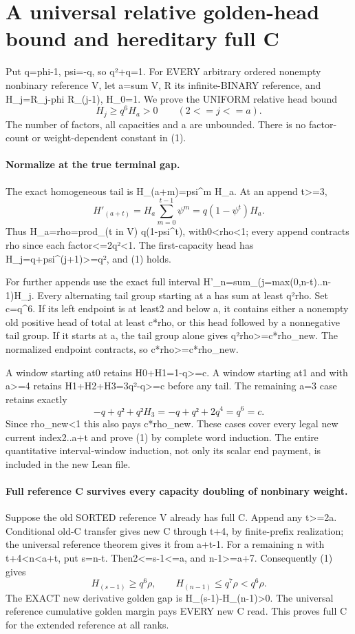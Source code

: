 \section{A universal relative golden-head bound and hereditary full C}
Put q=phi-1, psi=-q, so q²+q=1. For EVERY arbitrary ordered
nonempty nonbinary reference V, let a=sum V, R its infinite-BINARY
reference, and H_j=R_j-phi R_(j-1), H_0=1. We prove the UNIFORM
relative head bound
\[
                   H_j\ge q^6 H_a>0\qquad(2<=j<=a).     \tag{1}
\]
The number of factors, all capacities and a are unbounded.
There is no factor-count or weight-dependent constant in (1).

\paragraph{Normalize at the true terminal gap.}
The exact homogeneous tail is H_(a+m)=psi^m H_a. At an append t>=3,
\[
 H'_(a+t)=H_a\sum_{m=0}^{t-1}\psi^m
        =q(1-\psi^t)H_a.
\]
Thus H_a=rho=prod_(t in V) q(1-psi^t), with0<rho<1;
every append contracts rho since each factor<=2q²<1.
The first-capacity head has H_j=q+psi^(j+1)>=q², and (1) holds.

For further appends use the exact full interval
H'_n=sum_(j=max(0,n-t)..n-1)H_j. Every alternating tail group
starting at a has sum at least q²rho. Set c=q^6.
If its left endpoint is at least2 and below a, it contains either
a nonempty old positive head of total at least c*rho, or this
head followed by a nonnegative tail group. If it starts at a,
the tail group alone gives q²rho>=c*rho_new.
The normalized endpoint contracts, so c*rho>=c*rho_new.

A window starting at0 retains H0+H1=1-q>=c. A window starting
at1 and with a>=4 retains H1+H2+H3=3q²-q>=c before any tail.
The remaining a=3 case retains exactly
\[
                  -q+q²+q²H_3=-q+q²+2q^4=q^6=c.
\]
Since rho_new<1 this also pays c*rho_new. These cases cover
every legal new current index2..a+t and prove (1) by complete
word induction. The entire quantitative interval-window induction,
not only its scalar end payment, is included in the new Lean file.

\paragraph{Full reference C survives every capacity doubling of nonbinary weight.}
Suppose the old SORTED reference V already has full C. Append
any t>=2a. Conditional old-C transfer gives new C through t+4,
by finite-prefix realization; the universal reference theorem
gives it from a+t-1. For a remaining n with t+4<n<a+t, put
s=n-t. Then2<=s-1<=a, and n-1>=a+7. Consequently (1) gives
\[
 H_(s-1)\ge q^6\rho,
 \qquad H_(n-1)\le q^7\rho<q^6\rho.
\]
The EXACT new derivative golden gap is H_(s-1)-H_(n-1)>0.
The universal reference cumulative golden margin pays EVERY new
C read. This proves full C for the extended reference at all ranks.

